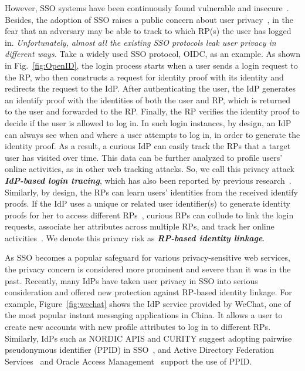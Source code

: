 However, SSO systems have been continuously found vulnerable and insecure~\cite{WangCW12,ccsSunB12,SomorovskyMSKJ12,ArmandoCCCPS13,DiscoveringJCS,dimvaLiM16,WangZLG16,MainkaMS16, MainkaMSW17,YangLCZ18}. Besides, the adoption of SSO raises a public concern about user privacy~\cite{maler2008venn,NIST2017draft,BrowserID,SPRESSO}, in the fear that an adversary may be able to track to which RP(s) the user has logged in. {\em Unfortunately, almost all the existing SSO protocols leak user privacy in different ways.} Take a widely used SSO protocol, OIDC, as an example. As shown in Fig.~\ref{fig:OpenID}, the login process starts when a user sends a login request to the RP, %
who then constructs a request for identity proof with its identity and redirects the request to the IdP. %
After authenticating the user, the IdP generates an identify proof with the identities of both the user and RP, %
which is returned to the user and forwarded to the RP. %
Finally, the RP verifies the identity proof to decide if the user is allowed to log in. In such login instances, by design, an IdP can always see when and where a user attempts to log in, in order to generate the identity proof. As a result, a curious IdP can easily track the RPs that a target user has visited over time. This data can be further analyzed to profile users' online activities, as in other web tracking attacks. So, we call this privacy attack \textbf{\em IdP-based login tracing}, which has also been reported by previous research~\cite{BrowserID,SPRESSO}. Similarly, by design, the RPs can learn users' identities from the received identify proofs. If the IdP uses a unique or related user identifier(s) to generate identity proofs for her to access different RPs~\cite{Google, FirefoxAccount}, curious RPs can collude to link the login requests, associate her attributes across multiple RPs, and track her online activities~\cite{maler2008venn}. We denote this privacy risk as \textbf{\em RP-based identity linkage}.

As SSO becomes a popular safeguard for various privacy-sensitive web services, the privacy concern is considered more prominent and severe than it was in the past. Recently, many IdPs have taken user privacy in SSO into serious consideration and offered new protection against RP-based identity linkage. For example, Figure~\ref{fig:wechat} shows the IdP service provided by WeChat, one of the most popular instant messaging applications in China. It allows a user to create new accounts with new profile attributes to log in to different RPs. Similarly, IdPs such as NORDIC APIS and CURITY suggest adopting pairwise pseudonymous identifier (PPID) in SSO~\cite{Nordic, Curity}, and Active Directory Federation Services~\cite{MS} and Oracle Access Management~\cite{Oracle} support the use of PPID.

